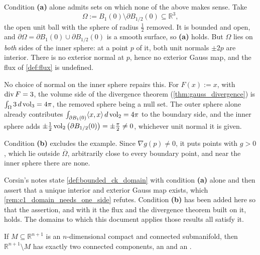 \begin{remark}
\label{rem:c1_domain_needs_one_side}
Condition \textbf{(a)} alone admits sets on which none of the above makes sense. Take
\[\Omega := B_1(0) \setminus \partial B_{1/2}(0) \subseteq \mathbb{R}^3,\]
the open unit ball with the sphere of radius $\tfrac12$ removed. It is bounded and open, and
$\partial\Omega = \partial B_1(0) \cup \partial B_{1/2}(0)$ is a smooth surface, so
\textbf{(a)} holds. But $\Omega$ lies on \emph{both} sides of the inner sphere: at a point $p$
of it, both unit normals $\pm 2p$ are interior. There is no exterior normal at $p$, hence no
exterior Gauss map, and the flux of \cref{def:flux} is undefined.

No choice of normal on the inner sphere repairs this. For $F(x) := x$, with $\operatorname{div} F = 3$, the
volume side of the divergence theorem (\cref{thm:gauss_divergence}) is
$\int_\Omega 3\,d\operatorname{vol}_3 = 4\pi$, the removed sphere being a null set. The outer sphere alone
already contributes $\int_{\partial B_1(0)}\langle x,x\rangle\,d\operatorname{vol}_2 = 4\pi$ to the boundary
side, and the inner sphere adds $\pm\tfrac12\operatorname{vol}_2\big(\partial B_{1/2}(0)\big) = \pm\tfrac{\pi}{2}
\neq 0$, whichever unit normal it is given.

Condition \textbf{(b)} excludes the example. Since $\nabla g(p) \neq 0$, it puts points with
$g > 0$, which lie outside $\overline\Omega$, arbitrarily close to every boundary point, and
near the inner sphere there are none.
\end{remark}

\begin{ainote}
Corsin's notes state \cref{def:bounded_ck_domain} with condition \textbf{(a)} alone and then
assert that a unique interior and exterior Gauss map exists, which
\cref{rem:c1_domain_needs_one_side} refutes. Condition \textbf{(b)} has been added here so that
the assertion, and with it the flux and the divergence theorem built on it, holds. The domains to
which this document applies those results all satisfy it.
\end{ainote}

\begin{theorem}
\label{thm:jordan_brouwer}
If $M \subseteq \mathbb{R}^{n+1}$ is an $n$-dimensional compact and connected submanifold,
then $\mathbb{R}^{n+1}\setminus M$ has exactly two connected components, an
 and an .
\end{theorem}

